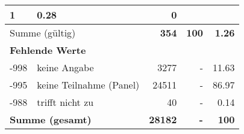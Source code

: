 \begin{longtable}{lXrrr}
       \num{1} &
       \num[round-mode=places,round-precision=2]{0.28} &
         \num[round-mode=places,round-precision=2]{0} \\
     \midrule
     \multicolumn{2}{l}{Summe (gültig)} &
       \textbf{\num{354}} &
     \textbf{100} &
       \textbf{\num[round-mode=places,round-precision=2]{1.26}} \\
     \multicolumn{5}{l}{\textbf{Fehlende Werte}}\\
       -998 &
       keine Angabe &
         \num{3277} &
        - &
         \num[round-mode=places,round-precision=2]{11.63} \\
       -995 &
       keine Teilnahme (Panel) &
         \num{24511} &
        - &
         \num[round-mode=places,round-precision=2]{86.97} \\
       -988 &
       trifft nicht zu &
         \num{40} &
        - &
         \num[round-mode=places,round-precision=2]{0.14} \\
     \midrule
     \multicolumn{2}{l}{\textbf{Summe (gesamt)}} &
          \textbf{\num{28182}} &
        \textbf{-} &
        \textbf{100} \\
     \bottomrule
     \end{longtable}
     
